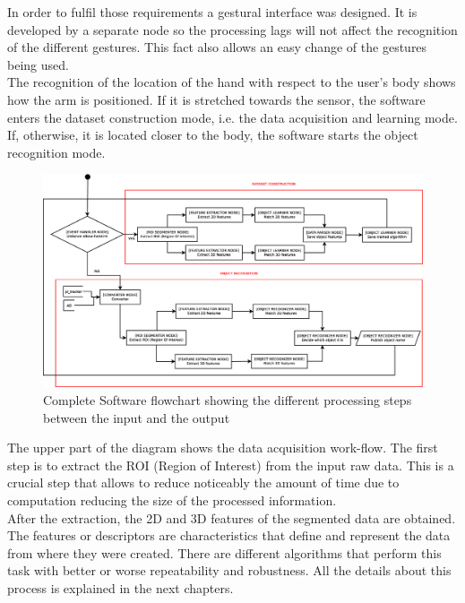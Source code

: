 In order to fulfil those requirements a gestural interface was designed. It is developed by a separate node so the processing lags will not affect the recognition of the different gestures. This fact also allows an easy change of the gestures being used. 
\\

The recognition of the location of the hand with respect to the user's body shows how the arm is positioned. If it is stretched towards the sensor, the software enters the dataset construction mode, i.e. the data acquisition and learning mode. If, otherwise, it is located closer to the body, the software starts the object recognition mode. 
\\

\begin{figure}[h]
	\begin{center}
\includegraphics[scale=0.2]{img/diagrams/flowcharts.eps}
	\caption[Software flowchart]{Complete Software flowchart showing the different processing steps between the input and the output}
	\end{center}
\end{figure}


The upper part of the diagram shows the data acquisition work-flow. The first step is to extract the ROI (Region of Interest) from the input raw data. This is a crucial step that allows to reduce noticeably the amount of time due to computation reducing the size of the processed information. 
\\

After the extraction, the 2D and 3D features of the segmented data are obtained. The features or descriptors are characteristics that define and represent the data from where they were created. There are different algorithms that perform this task with better or worse repeatability and robustness. All the details about this process is explained in the next chapters. 
\\

